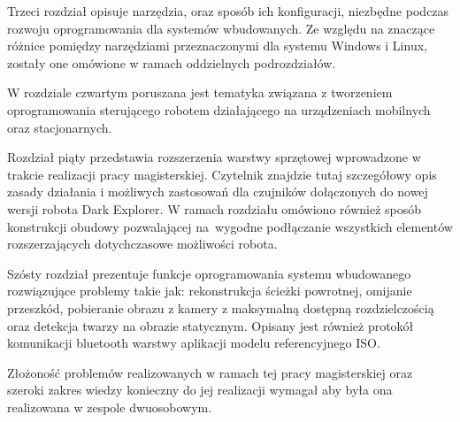 Trzeci rozdział opisuje narzędzia, oraz sposób ich konfiguracji, niezbędne
podczas rozwoju oprogramowania dla systemów wbudowanych. Ze względu na znaczące
różnice pomiędzy narzędziami przeznaczonymi dla systemu Windows i Linux, zostały
one omówione w ramach oddzielnych podrozdziałów.

W rozdziale czwartym poruszana jest tematyka związana z tworzeniem oprogramowania
sterującego robotem działającego na urządzeniach mobilnych oraz stacjonarnych.

Rozdział piąty przedstawia rozszerzenia warstwy sprzętowej wprowadzone w trakcie
realizacji pracy magisterskiej. Czytelnik znajdzie tutaj szczegółowy opis zasady
działania i możliwych zastosowań dla czujników dołączonych do nowej wersji robota
Dark Explorer. W ramach rozdziału omówiono również sposób konstrukcji obudowy
pozwalającej na~wygodne podłączanie wszystkich elementów rozszerzających
dotychczasowe możliwości robota.

Szósty rozdział prezentuje funkcje oprogramowania systemu wbudowanego
rozwiązujące problemy takie jak: rekonstrukcja ścieżki powrotnej, omijanie
przeszkód, pobieranie obrazu z kamery z maksymalną dostępną rozdzielczością oraz
detekcja twarzy na obrazie statycznym. Opisany jest również protokół komunikacji
bluetooth warstwy aplikacji modelu referencyjnego ISO.

Złożoność problemów realizowanych w ramach tej pracy magisterskiej oraz szeroki
zakres wiedzy konieczny do jej realizacji wymagał aby była ona realizowana w
zespole dwuosobowym.